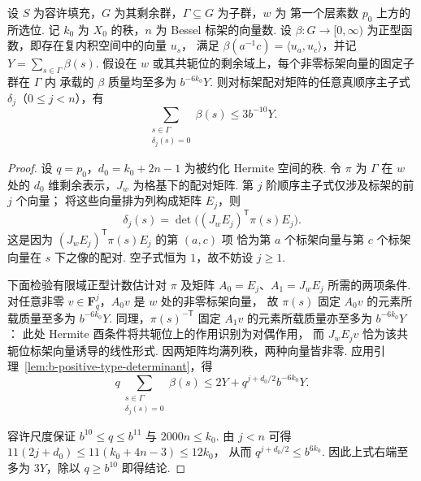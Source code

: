 \begin{lemma}[固定向量条件下顺序主子式为零的估计]
\label{lem:b-leading-minor}
\emitthmsource
设 $S$ 为容许填充，$G$ 为其剩余群，$\Gamma\subseteq G$ 为子群，$w$ 为
第一个层素数 $p_0$ 上方的所选位. 记 $k_0$ 为 $X_0$ 的秩，$n$ 为 Bessel 标架的向量数.
设 $\beta:G\to[0,\infty)$ 为正型函数，即存在复内积空间中的向量 $u_s$，
满足 $\beta(a^{-1}c)=\langle u_a,u_c\rangle$，并记 $Y=\sum_{s\in\Gamma}\beta(s)$.
假设在 $w$ 或其共轭位的剩余域上，每个非零标架向量的固定子群在 $\Gamma$ 内
承载的 $\beta$ 质量均至多为 $b^{-6k_0}Y$.
则对标架配对矩阵的任意真顺序主子式 $\delta_j$（$0\le j<n$），有
\[
 \sum_{\substack{s\in\Gamma\\\delta_j(s)=0}}\beta(s)\le 3b^{-10}Y .
\]
\end{lemma}
\begin{proof}
设 $q=p_0$，$d_0=k_0+2n-1$ 为被约化 Hermite 空间的秩.
令 $\pi$ 为 $\Gamma$ 在 $w$ 处的 $d_0$ 维剩余表示，$J_w$ 为格基下的配对矩阵.
第 $j$ 阶顺序主子式仅涉及标架的前 $j$ 个向量；
将这些向量排为列构成矩阵 $E_j$，则
\[
 \delta_j(s)=\det\bigl((J_w E_j)^{\mathsf T}\pi(s)E_j\bigr).
\]
这是因为 $(J_w E_j)^{\mathsf T}\pi(s)E_j$ 的第 $(a,c)$ 项
恰为第 $a$ 个标架向量与第 $c$ 个标架向量在 $s$ 下之像的配对.
空子式恒为 $1$，故不妨设 $j\ge1$.

下面检验有限域正型计数估计对 $\pi$ 及矩阵
$A_0=E_j$、$A_1=J_wE_j$ 所需的两项条件.
对任意非零 $v\in\mathbf F_q^j$，$A_0v$ 是 $w$ 处的非零标架向量，
故 $\pi(s)$ 固定 $A_0v$ 的元素所载质量至多为 $b^{-6k_0}Y$.
同理，$\pi(s)^{-\mathsf T}$ 固定 $A_1v$ 的元素所载质量亦至多为 $b^{-6k_0}Y$：
此处 Hermite 酉条件将共轭位上的作用识别为对偶作用，
而 $J_wE_jv$ 恰为该共轭位标架向量诱导的线性形式.
因两矩阵均满列秩，两种向量皆非零.
应用引理~\ref{lem:b-positive-type-determinant}，得
\[
 q\sum_{\substack{s\in\Gamma\\\delta_j(s)=0}}\beta(s)
   \le 2Y+q^{j+d_0/2}b^{-6k_0}Y .
\]

容许尺度保证 $b^{10}\le q\le b^{11}$ 与 $2000n\le k_0$.
由 $j<n$ 可得
$11(2j+d_0)\le11(k_0+4n-3)\le12k_0$，
从而 $q^{j+d_0/2}\le b^{6k_0}$.
因此上式右端至多为 $3Y$，除以 $q\ge b^{10}$ 即得结论.
\end{proof}

